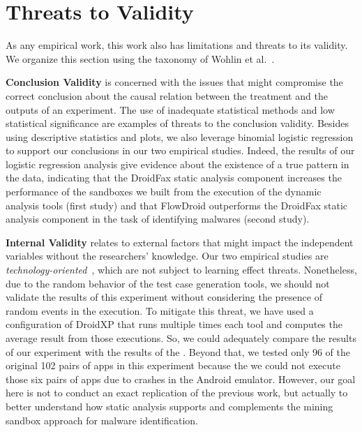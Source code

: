 \section{Threats to Validity}

As any empirical work, this work also has
limitations and threats to its validity. We
organize this section using the taxonomy
of Wohlin et al.~\cite[Chapter 8]{10.5555/2349018}.

\textbf{Conclusion Validity} is concerned with
the issues that might compromise the
correct conclusion about the causal relation
between the treatment and the outputs of an
experiment. The use of inadequate statistical
methods and low statistical significance
are examples of threats to the conclusion validity.
Besides using descriptive statistics and
plots, we also leverage
binomial logistic regression to support our conclusions
in our two empirical studies. Indeed, the results of our logistic
regression analysis give evidence about the existence
of a true pattern in the data, indicating that the DroidFax
static analysis component increases the performance of the sandboxes
we built from the execution of the dynamic
analysis tools (first study) and that FlowDroid outperforms
the DroidFax static analysis component in the
task of identifying malwares (second study).

\textbf{Internal Validity} relates to external factors that might
impact the independent variables without the researchers' 
knowledge. Our two empirical studies are \emph{technology-oriented}~\cite{10.5555/2349018,expruna},
which are not subject to learning effect threats. Nonetheless,
due to the random behavior of the test case generation tools,
we should not validate the results of this experiment without considering the presence of
random events in the execution. To mitigate this threat, we have used a configuration of
DroidXP that runs multiple times each tool and computes the average result
from those executions. So, we could adequately compare the results of our experiment with
the results of the \blls. Beyond that,
we tested only 96 of the original 102 pairs of apps in this experiment because the we
could not execute those six pairs of apps due to crashes in the Android emulator.
However, our goal here is not to conduct an exact replication of the previous work,
but actually to better understand how static analysis supports and complements
the mining sandbox approach for malware identification. 

